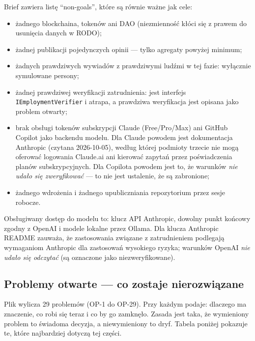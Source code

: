 Brief zawiera listę ``non-goals'', które są równie ważne jak cele:

\begin{itemize}[itemsep=2pt]
  \item żadnego blockchaina, tokenów ani DAO (niezmienność kłóci się z prawem
        do usunięcia danych w RODO);
  \item żadnej publikacji pojedynczych opinii --- tylko agregaty powyżej minimum;
  \item żadnych prawdziwych wywiadów z prawdziwymi ludźmi w tej fazie: wyłącznie
        symulowane persony;
  \item żadnej prawdziwej weryfikacji zatrudnienia: jest interfejs
        \texttt{IEmploymentVerifier} i atrapa, a prawdziwa weryfikacja jest
        opisana jako problem otwarty;
  \item brak obsługi tokenów subskrypcji Claude (Free/Pro/Max) ani GitHub
        Copilot jako backendu modelu. Dla Claude powodem jest dokumentacja
        Anthropic (czytana 2026-10-05), według której podmioty trzecie nie
        mogą oferować logowania Claude.ai ani kierować zapytań przez
        poświadczenia planów subskrypcyjnych. Dla Copilota powodem jest to, że
        warunków \emph{nie udało się zweryfikować} --- to nie jest ustalenie,
        że są zabronione;
  \item żadnego wdrożenia i żadnego upubliczniania repozytorium przez
        sesje robocze.
\end{itemize}

Obsługiwany dostęp do modelu to: klucz API Anthropic, dowolny punkt końcowy
zgodny z OpenAI i modele lokalne przez Ollama. Dla klucza Anthropic README
zauważa, że zastosowania związane z zatrudnieniem podlegają wymaganiom
Anthropic dla zastosowań wysokiego ryzyka; warunków OpenAI \emph{nie
udało się odczytać} (są oznaczone jako niezweryfikowane).

\subsection{Problemy otwarte --- co zostaje nierozwiązane}

Plik  wylicza 29 problemów (OP-1 do OP-29).
Przy każdym podaje: dlaczego ma znaczenie, co robi się teraz i co by go zamknęło.
Zasada jest taka, że wymieniony problem to świadoma decyzja, a niewymieniony
to dryf. Tabela poniżej pokazuje te, które najbardziej dotyczą tej części.

